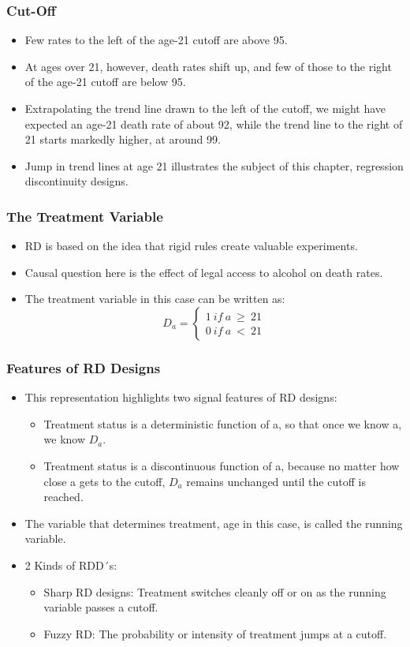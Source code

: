 \documentclass{beamer}
\begin{document}
\begin{frame}
\frametitle{Cut-Off}
\begin{itemize}
	\item Few rates to the left of the age-21 cutoff are above 95. 
	\item At ages over 21, however, death rates shift up, and few of those to the right of the age-21 cutoff are below 95.
	\item Extrapolating the trend line drawn to the left of the cutoff, we might have expected an age-21 death rate of about 92, while the trend line to the right of 21 starts markedly higher, at around 99.
	\item Jump in trend lines at age 21 illustrates the subject of this chapter, regression discontinuity designs.
\end{itemize}
\end{frame}
\begin{frame}
\frametitle{The Treatment Variable}
\begin{itemize}
	\item RD is based on the idea that rigid rules create valuable experiments.
	\item Causal question here is the effect of legal access to alcohol on death rates. 
	\item The treatment variable in this case can be written as: 
	$$D_a = \left\{
	\begin{align}
1~ if~ a~ \geq ~21 \\
0~ if~ a~ < ~21		
	\end{align}
	$$
\end{itemize}

\end{frame}
\begin{frame}
\frametitle{Features of RD Designs}
\begin{itemize}
	\item This representation highlights two signal features of RD designs:
	\begin{itemize}
		\item[\bullet] Treatment status is a deterministic function of a, so that once we know a, we know $D_a$.
		\item[\bullet] Treatment status is a discontinuous function of a, because no matter how close a gets to the cutoff, $D_a$ remains unchanged until the cutoff is reached.
	\end{itemize}
	\item The variable that determines treatment, age in this case, is called the running variable.
	\item 2	Kinds of RDD´s:
\begin{itemize}
		\item[\bullet] Sharp RD designs: Treatment switches cleanly off or on as the running variable passes a cutoff.
		\item[\bullet] Fuzzy RD: The probability or intensity of treatment jumps at a cutoff.
	\end{itemize}
\end{itemize}
\end{frame}
\end{document}
